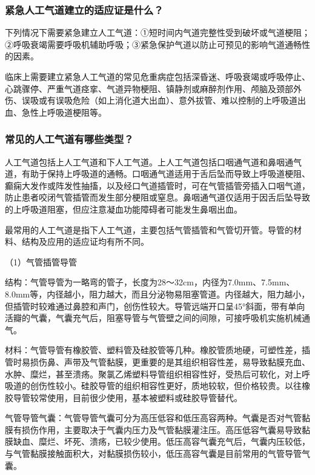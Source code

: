\subsubsection{紧急人工气道建立的适应证是什么？}

下列情况下需要紧急建立人工气道：①短时间内气道完整性受到破坏或气道梗阻；②呼吸衰竭需要呼吸机辅助呼吸；③紧急保护气道以防止可预见的影响气道通畅性的因素。

临床上需要建立紧急人工气道的常见危重病症包括深昏迷、呼吸衰竭或呼吸停止、心跳骤停、严重气道痉挛、气道异物梗阻、镇静剂或麻醉剂作用、颅脑及颈部外伤、误吸或有误吸危险（如上消化道大出血）、意外拔管、难以控制的上呼吸道出血、急性上呼吸道梗阻等。

\subsubsection{常见的人工气道有哪些类型？}

人工气道包括上人工气道和下人工气道。上人工气道包括口咽通气道和鼻咽通气道，有助于保持上呼吸道的通畅。口咽通气道适用于舌后坠而导致上呼吸道梗阻、癫痫大发作或阵发性抽搐，以及经口气道插管时，可在气管插管旁插入口咽气道，防止患者咬闭气管插管而发生部分梗阻或窒息。鼻咽通气道仅适用于因舌后坠导致的上呼吸道阻塞，但应注意凝血功能障碍者可能发生鼻咽出血。

最常用的人工气道是指下人工气道，主要包括气管插管和气管切开管。导管的材料、结构及应用的适应证均有所不同。

（1）气管插管导管

结构：气管导管为一略弯的管子，长度为28～32cm，内径为7.0mm、7.5mm、8.0mm等，内径越小，阻力越大，而且分泌物易阻塞管道。内径越大，阻力越小，但插管时较难通过鼻腔和声门，创伤性较大。导管远端开口呈45°斜面，带有单向活瓣的气囊，气囊充气后，阻塞导管与气管壁之间的间隙，可接呼吸机实施机械通气。

材料：气管导管有橡胶管、塑料管及硅胶管等几种。橡胶管质地硬，可塑性差，插管时易损伤鼻、声带及气管黏膜，更重要的是其组织相容性差，易导致黏膜充血、水肿、糜烂，甚至溃疡。聚氯乙烯塑料导管组织相容性好，受热后可软化，对上呼吸道的创伤性较小。硅胶导管的组织相容性更好，质地较软，但价格较贵。以往橡胶导管较常使用，目前很少使用，基本被塑料或硅胶导管替代。

气管导管气囊：气管导管气囊可分为高压低容和低压高容两种。气囊是否对气管黏膜有损伤作用，主要取决于气囊内压力及气管黏膜灌注压。高压低容气囊易导致黏膜缺血、糜烂、坏死、溃疡，已较少使用。低压高容气囊充气后，气囊内压较低，与气管黏膜接触面积大，对黏膜损伤较小，低压高容气囊是目前常用的气管导管气囊。

